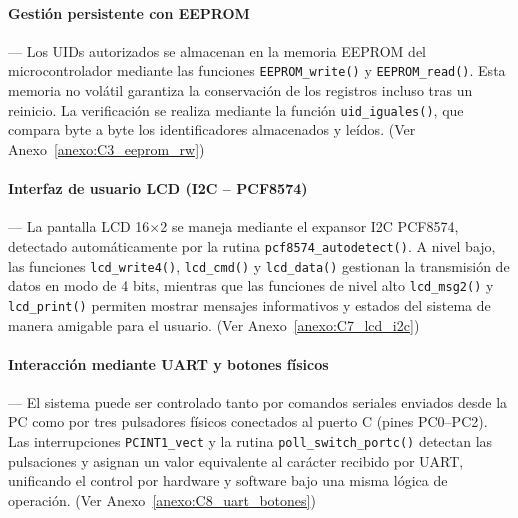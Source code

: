 \vspace{1em}

\paragraph*{\textbf{Gestión persistente con EEPROM}}---
Los UIDs autorizados se almacenan en la memoria EEPROM del microcontrolador mediante las funciones \texttt{EEPROM\_write()} y \texttt{EEPROM\_read()}. Esta memoria no volátil garantiza la conservación de los registros incluso tras un reinicio. La verificación se realiza mediante la función \texttt{uid\_iguales()}, que compara byte a byte los identificadores almacenados y leídos. (Ver Anexo~\ref{anexo:C3_eeprom_rw})

\vspace{1em}

\paragraph*{\textbf{Interfaz de usuario LCD (I2C – PCF8574)}}---
La pantalla LCD 16×2 se maneja mediante el expansor I2C PCF8574, detectado automáticamente por la rutina \texttt{pcf8574\_autodetect()}. A nivel bajo, las funciones \texttt{lcd\_write4()}, \texttt{lcd\_cmd()} y \texttt{lcd\_data()} gestionan la transmisión de datos en modo de 4 bits, mientras que las funciones de nivel alto \texttt{lcd\_msg2()} y \texttt{lcd\_print()} permiten mostrar mensajes informativos y estados del sistema de manera amigable para el usuario. (Ver Anexo~\ref{anexo:C7_lcd_i2c})

\vspace{1em}

\paragraph*{\textbf{Interacción mediante UART y botones físicos}}---
El sistema puede ser controlado tanto por comandos seriales enviados desde la PC como por tres pulsadores físicos conectados al puerto C (pines PC0–PC2). Las interrupciones \texttt{PCINT1\_vect} y la rutina \texttt{poll\_switch\_portc()} detectan las pulsaciones y asignan un valor equivalente al carácter recibido por UART, unificando el control por hardware y software bajo una misma lógica de operación. (Ver Anexo~\ref{anexo:C8_uart_botones})

\vspace{1em}

